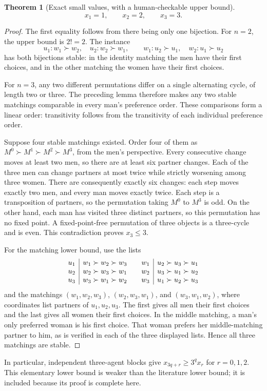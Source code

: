 \documentclass[11pt,a4paper]{article}
\newtheorem{theorem}{Theorem}[section]
\theoremstyle{definition}
\theoremstyle{remark}
\begin{document}
\begin{theorem}[Exact small values, with a human-checkable upper bound]
\[
 x_1=1,\qquad x_2=2,\qquad x_3=3.
\]
\end{theorem}
\begin{proof}
The first equality follows from there being only one bijection. For $n=2$, the
upper bound is $2!=2$. The instance
\[
 u_1:w_1\succ w_2,\quad u_2:w_2\succ w_1,\qquad
 w_1:u_2\succ u_1,\quad w_2:u_1\succ u_2
\]
has both bijections stable: in the identity matching the men have their first
choices, and in the other matching the women have their first choices.

For $n=3$, any two different permutations differ on a single alternating cycle,
of length two or three. The preceding lemma therefore makes any two stable
matchings comparable in every man's preference order. These comparisons form a
linear order: transitivity follows from the transitivity of each individual
preference order.

Suppose four stable matchings existed. Order four of them as
$M^0\succ M^1\succ M^2\succ M^3$, from the men's perspective. Every consecutive
change moves at least two men, so there are at least six partner changes. Each
of the three men can change partners at most twice while strictly worsening
among three women. There are consequently exactly six changes: each step moves
exactly two men, and every man moves exactly twice. Each step is a transposition
of partners, so the permutation taking $M^0$ to $M^3$ is odd. On the other hand,
each man has visited three distinct partners, so this permutation has no fixed
point. A fixed-point-free permutation of three objects is a three-cycle and is
even. This contradiction proves $x_3\leq3$.

For the matching lower bound, use the lists
\[
\begin{array}{c|c@{\qquad}c|c}
 u_1&w_1\succ w_2\succ w_3&w_1&u_2\succ u_3\succ u_1\\
 u_2&w_2\succ w_3\succ w_1&w_2&u_3\succ u_1\succ u_2\\
 u_3&w_3\succ w_1\succ w_2&w_3&u_1\succ u_2\succ u_3
\end{array}
\]
and the matchings $(w_1,w_2,w_3)$, $(w_2,w_3,w_1)$, and $(w_3,w_1,w_2)$,
where coordinates list partners of $u_1,u_2,u_3$. The first gives all men their
first choices and the last gives all women their first choices. In the middle
matching, a man's only preferred woman is his first choice. That woman prefers
her middle-matching partner to him, as is verified in each of the three displayed
lists. Hence all three matchings are stable.
\end{proof}
In particular, independent three-agent blocks give
$x_{3q+r}\geq3^q x_r$ for $r=0,1,2$. This elementary lower bound is weaker than
the literature lower bound; it is included because its proof is complete here.
\end{document}
